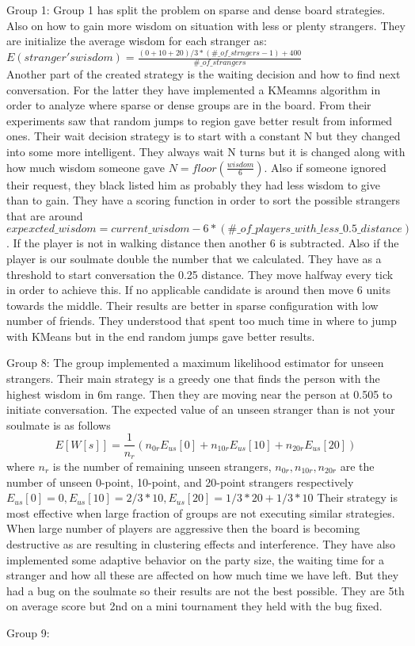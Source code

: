 Group 1:
Group 1 has split the problem on sparse and dense board strategies. Also on how 
to gain more wisdom on situation with less or plenty strangers. They are initialize
the average wisdom for each stranger as: $E(stranger's wisdom) = \frac{(0+10+20)/3 * (\#\_of\_strngers-1)+400}{\#\_of\_strangers}$\\
Another part of the created strategy is the waiting decision and how to find next
conversation.
For the latter they have implemented a KMeamns algorithm in order to analyze
where sparse or dense groups are in the board. From their experiments saw that 
random jumps to region gave better result from informed ones. Their wait decision
strategy is to start with a constant N but they changed into some more intelligent.
They always wait N turns but it is changed along with how much wisdom someone
gave $N = floor(\frac{wisdom}{6})$. Also if someone ignored their request, they
black listed him as probably they had less wisdom to give than to gain. They have
a scoring function in order to sort the possible strangers that are around 
$expexcted\_wisdom = current\_wisdom-6*(\#\_of\_players\_with\_less\_0.5\_distance)$.
If the player is not in walking distance then another 6 is subtracted. Also if 
the player is our soulmate double the number that we calculated. They have as a 
threshold to start conversation the 0.25 distance. They move halfway every tick 
in order to achieve this. If no applicable candidate is around then move 6 units
towards the middle. Their results are better in sparse configuration with low number
of friends. They understood that spent too much time in where to jump with KMeans
but in the end random jumps gave better results.

Group 8:
The group implemented a maximum likelihood estimator for unseen strangers. Their
main strategy is a greedy one that finds the person with the highest wisdom in 6m
range. Then they are moving near the person at 0.505 to initiate conversation.
The expected value of an unseen stranger than is not your soulmate is as follows
\begin{equation*}
E[W[s]] = \frac{1}{n_r}(n_{0r}E_{us}[0] + n_{10r}E_{us}[10] + n_{20r}E_{us}[20])
\end{equation*}
where $n_r$ is the number of remaining unseen strangers, $n_{0r},n_{10r},n_{20r}$
are the number of unseen 0-point, 10-point, and 20-point strangers respectively
$E_{us}[0]=0,E_{us}[10] = 2/3 *10,E_{us}[20] = 1/3*20+1/3*10$
Their strategy is most effective when large fraction of groups are not executing 
similar strategies. When large number of players are aggressive then the board
is becoming destructive as are resulting in clustering effects and interference.
They have also implemented some adaptive behavior on the party size, the waiting
time for a stranger and how all these are affected on how much time we have left.
But they had a bug on the soulmate so their results are not the best possible.
They are 5th on average score but 2nd on a mini tournament they held with the bug
fixed.

Group 9:
